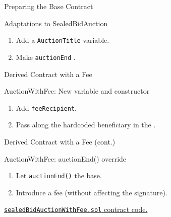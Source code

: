 \documentclass[handout]{beamer}
\begin{document}
\begin{frame}{Preparing the Base Contract}

\begin{samplecode}{Adaptations to SealedBidAuction}
	
\end{samplecode}
\begin{enumerate}
	\item	Add a \texttt{AuctionTitle} variable.
	\item	Make \texttt{auctionEnd} .
\end{enumerate}

\end{frame}

\begin{frame}{Derived Contract with a Fee}

\begin{samplecode}{AuctionWithFee: New variable and constructor}
	
\end{samplecode}
\begin{enumerate}
	\item	Add \texttt{feeRecipient}.
	\item	Pass along the hardcoded beneficiary in the .
\end{enumerate}

\end{frame}

\begin{frame}{Derived Contract with a Fee (cont.)}

\begin{samplecode}{AuctionWithFee: auctionEnd() override}
	
\end{samplecode}
\begin{enumerate}
	\item	Let \texttt{auctionEnd()}  the base.
	\item	Introduce a fee (without affecting the signature).
\end{enumerate}

\vspace{1em}

\link \href{https://raw.githubusercontent.com/cifunibas/Smart-Contracts-DeFi/main/contracts/sealedBidAuctionWithFee.sol}{\texttt{sealedBidAuctionWithFee.sol} contract code.}

\end{frame}
\end{document}
